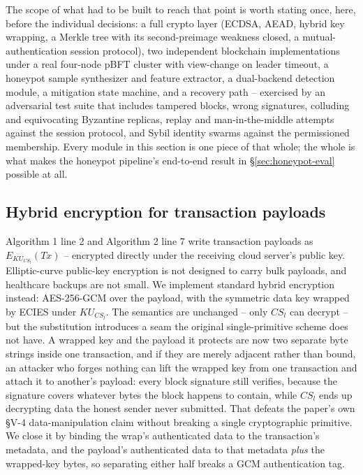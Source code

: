 \documentclass[conference]{IEEEtran}
\begin{document}
The scope of what had to be built to reach that point is worth stating once, here, before the
individual decisions: a full crypto layer (ECDSA, AEAD, hybrid key wrapping, a Merkle tree with
its second-preimage weakness closed, a mutual-authentication session protocol), two independent
blockchain implementations under a real four-node pBFT cluster with view-change on leader
timeout, a honeypot sample synthesizer and feature extractor, a dual-backend detection module,
a mitigation state machine, and a recovery path -- exercised by an adversarial test suite that
includes tampered blocks, wrong signatures, colluding and equivocating Byzantine replicas, replay
and man-in-the-middle attempts against the session protocol, and Sybil identity swarms against
the permissioned membership. Every module in this section is one piece of that whole; the whole
is what makes the honeypot pipeline's end-to-end result in \S\ref{sec:honeypot-eval}
possible at all.

\subsection{Hybrid encryption for transaction payloads}

Algorithm 1 line 2 and Algorithm 2 line 7 write transaction payloads as $E_{KU_{CS_l}}(Tx)$ --
encrypted directly under the receiving cloud server's public key. Elliptic-curve public-key
encryption is not designed to carry bulk payloads, and healthcare backups are not small. We
implement standard hybrid encryption instead: AES-256-GCM over the payload, with the
symmetric data key wrapped by ECIES under $KU_{CS_l}$. The semantics are unchanged -- only
$CS_l$ can decrypt -- but the substitution introduces a seam the original single-primitive
scheme does not have. A wrapped key and the payload it protects are now two separate byte
strings inside one transaction, and if they are merely adjacent rather than bound, an attacker
who forges nothing can lift the wrapped key from one transaction and attach it to another's
payload: every block signature still verifies, because the signature covers whatever bytes the
block happens to contain, while $CS_l$ ends up decrypting data the honest sender never
submitted. That defeats the paper's own \S V-4 data-manipulation claim without breaking a single
cryptographic primitive. We close it by binding the wrap's authenticated data to the
transaction's metadata, and the payload's authenticated data to that metadata \emph{plus} the
wrapped-key bytes, so separating either half breaks a GCM authentication tag.
\end{document}
